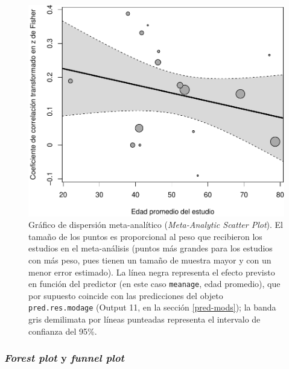 \documentclass[
  bookmarksnumbered]{article}
\begin{document}
\begin{figure}
\centering
\includegraphics{Meta-analysis_files/figure-latex/reg-plot1-1.pdf}
\caption{\label{fig:reg-plot1}Gráfico de dispersión meta-analítico (\emph{Meta-Analytic Scatter Plot}). El tamaño de los puntos es proporcional al peso que recibieron los estudios en el meta-análisis (puntos más grandes para los estudios con más peso, pues tienen un tamaño de muestra mayor y con un menor error estimado). La línea negra representa el efecto previsto en función del predictor (en este caso \texttt{meanage}, edad promedio), que por supuesto coincide con las predicciones del objeto \texttt{pred.res.modage} (Output 11, en la sección \ref{pred-mods}); la banda gris demilimata por líneas punteadas representa el intervalo de confianza del 95\%.}
\end{figure}

\hypertarget{plot-mod}{%
\subsubsection{\texorpdfstring{\emph{Forest plot} y \emph{funnel plot}}{Forest plot y funnel plot}}\label{plot-mod}}
\end{document}
